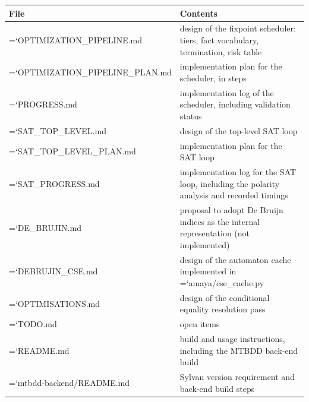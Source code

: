 \documentclass[10pt,a4paper]{article}
\newcommand{\code}[1]{{\small\ttfamily\hyphenchar\font=`\-\relax #1}}
\begin{document}
\begin{center}
\footnotesize
\begin{tabular}{lp{104mm}}
\toprule
File & Contents \\
\midrule
\code{OPTIMIZATION\_PIPELINE.md} & design of the fixpoint scheduler: tiers, fact vocabulary, termination, risk table \\
\code{OPTIMIZATION\_PIPELINE\_PLAN.\allowbreak md} & implementation plan for the scheduler, in steps \\
\code{PROGRESS.md} & implementation log of the scheduler, including validation status \\
\code{SAT\_TOP\_LEVEL.md} & design of the top-level SAT loop \\
\code{SAT\_TOP\_LEVEL\_PLAN.md} & implementation plan for the SAT loop \\
\code{SAT\_PROGRESS.md} & implementation log for the SAT loop, including the polarity analysis and recorded timings \\
\code{DE\_BRUJIN.md} & proposal to adopt De Bruijn indices as the internal representation (not implemented) \\
\code{DEBRUJIN\_CSE.md} & design of the automaton cache implemented in \code{amaya/cse\_cache.py} \\
\code{OPTIMISATIONS.md} & design of the conditional equality resolution pass \\
\code{TODO.md} & open items \\
\code{README.md} & build and usage instructions, including the MTBDD back-end build \\
\code{mtbdd-backend/README.md} & Sylvan version requirement and back-end build steps \\
\bottomrule
\end{tabular}
\end{center}
\end{document}
